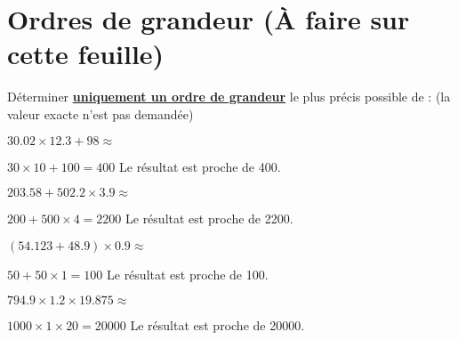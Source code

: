 \section{Ordres de grandeur  (\`A faire sur cette feuille)}

Déterminer \textbf{\underline{uniquement un ordre de grandeur}} le plus précis possible de : (la valeur exacte n'est pas demandée)

\begin{questions}
	\begin{multicols}{2}
		
	
		\question $\num{30.02} \times \num{12.3} + 98 \approx $
		\begin{solution}
			$\num{30}	\times 10 + 100 = 400	$
			Le résultat est proche de 400.
		\end{solution}
		\question $\num{203.58} + \num{502.2} \times \num{3.9} \approx $
		\begin{solution}
			$\num{200}	+ 500 \times 4 = 2200	$
			Le résultat est proche de 2200.
		\end{solution}
		\question $(\num{54.123} + \num{48.9}) \times \num{0.9} \approx$
		\begin{solution}
			$\num{50}	+ 50 \times 1 = 100	$
			Le résultat est proche de 100.
		\end{solution}
	
		\question $\num{794.9} \times \num{1.2} \times \num{19.875} \approx$
		\begin{solution}
			$\num{1000}	\times 1 \times 20 = \num{20000}	$
			Le résultat est proche de \num{20000}.
		\end{solution}
	\end{multicols}
\end{questions}